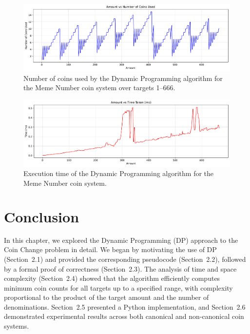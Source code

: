 \documentclass[12pt,a4paper]{report}
\begin{document}
\begin{itemize}
\begin{figure}[H]
  \centering
  \includegraphics[width=\textwidth]{graphs/dp_coins_meme_plot.pdf}
  \caption{Number of coins used by the Dynamic Programming algorithm for the Meme Number coin system over targets 1--666.}
  \label{fig:dp_coins_meme_number_plot}
\end{figure}

\begin{figure}[H]
  \centering
  \includegraphics[width=\textwidth]{graphs/dp_time_meme_plot.pdf}
  \caption{Execution time of the Dynamic Programming algorithm for the Meme Number coin system.}
  \label{fig:dp_time_meme_number_plot}
\end{figure}
\end{itemize}

\section{Conclusion}
\label{sec:dp_conclusion}

In this chapter, we explored the Dynamic Programming (DP) approach to the Coin Change problem in detail. We began by motivating the use of DP (Section~2.1) and provided the corresponding pseudocode (Section~2.2), followed by a formal proof of correctness (Section~2.3). The analysis of time and space complexity (Section~2.4) showed that the algorithm efficiently computes minimum coin counts for all targets up to a specified range, with complexity proportional to the product of the target amount and the number of denominations. Section~2.5 presented a Python implementation, and Section~2.6 demonstrated experimental results across both canonical and non-canonical coin systems.
\end{document}
